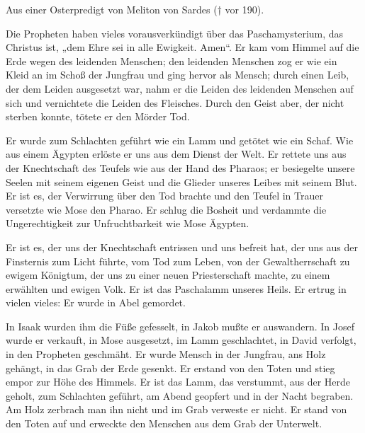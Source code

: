 \vspace{5pt}

Aus einer Osterpredigt von Meliton von Sardes († vor 190).

\vspace{5pt}


\lettrine[lines=3]{D}{}ie Propheten haben vieles vorausverkündigt über das Paschamysterium, das Christus ist, „dem Ehre sei in alle Ewigkeit. Amen“. Er kam vom Himmel auf die Erde wegen des leidenden Menschen; den leidenden Menschen zog er wie ein Kleid an im Schoß der Jungfrau und ging hervor als Mensch; durch einen Leib, der dem Leiden ausgesetzt war, nahm er die Leiden des leidenden Menschen auf sich und vernichtete die Leiden des Fleisches. Durch den Geist aber, der nicht sterben konnte, tötete er den Mörder Tod.

Er wurde zum Schlachten geführt wie ein Lamm und getötet wie ein Schaf. Wie aus einem Ägypten erlöste er uns aus dem Dienst der Welt. Er rettete uns aus der Knechtschaft des Teufels wie aus der Hand des Pharaos; er besiegelte unsere Seelen mit seinem eigenen Geist und die Glieder unseres Leibes mit seinem Blut. Er ist es, der Verwirrung über den Tod brachte und den Teufel in Trauer versetzte wie Mose den Pharao. Er schlug die Bosheit und verdammte die Ungerechtigkeit zur Unfruchtbarkeit wie Mose Ägypten.

Er ist es, der uns der Knechtschaft entrissen und uns befreit hat, der uns aus der Finsternis zum Licht führte, vom Tod zum Leben, von der Gewaltherrschaft zu ewigem Königtum, der uns zu einer neuen Priesterschaft machte, zu einem erwählten und ewigen Volk. Er ist das Paschalamm unseres Heils. Er ertrug in vielen vieles: Er wurde in Abel gemordet. 

In Isaak wurden ihm die Füße gefesselt, in Jakob mußte er auswandern. In Josef wurde er verkauft, in Mose ausgesetzt, im Lamm geschlachtet, in David verfolgt, in den Propheten geschmäht. Er wurde Mensch in der Jungfrau, ans Holz gehängt, in das Grab der Erde gesenkt. Er erstand von den Toten und stieg empor zur Höhe des Himmels. Er ist das Lamm, das verstummt, aus der Herde geholt, zum Schlachten geführt, am Abend geopfert und in der Nacht begraben. Am Holz zerbrach man ihn nicht und im Grab verweste er nicht. Er stand von den Toten auf und erweckte den Menschen aus dem Grab der Unterwelt.